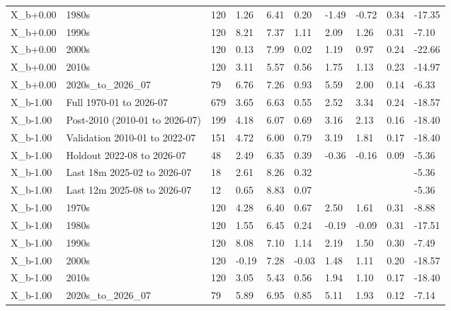 \begin{tabular}{llllllllll}
X\_b+0.00 & 1980s & 120 & 1.26 & 6.41 & 0.20 & -1.49 & -0.72 & 0.34 & -17.35 \\
X\_b+0.00 & 1990s & 120 & 8.21 & 7.37 & 1.11 & 2.09 & 1.26 & 0.31 & -7.10 \\
X\_b+0.00 & 2000s & 120 & 0.13 & 7.99 & 0.02 & 1.19 & 0.97 & 0.24 & -22.66 \\
X\_b+0.00 & 2010s & 120 & 3.11 & 5.57 & 0.56 & 1.75 & 1.13 & 0.23 & -14.97 \\
X\_b+0.00 & 2020s\_to\_2026\_07 & 79 & 6.76 & 7.26 & 0.93 & 5.59 & 2.00 & 0.14 & -6.33 \\
X\_b-1.00 & Full 1970-01 to 2026-07 & 679 & 3.65 & 6.63 & 0.55 & 2.52 & 3.34 & 0.24 & -18.57 \\
X\_b-1.00 & Post-2010 (2010-01 to 2026-07) & 199 & 4.18 & 6.07 & 0.69 & 3.16 & 2.13 & 0.16 & -18.40 \\
X\_b-1.00 & Validation 2010-01 to 2022-07 & 151 & 4.72 & 6.00 & 0.79 & 3.19 & 1.81 & 0.17 & -18.40 \\
X\_b-1.00 & Holdout 2022-08 to 2026-07 & 48 & 2.49 & 6.35 & 0.39 & -0.36 & -0.16 & 0.09 & -5.36 \\
X\_b-1.00 & Last 18m 2025-02 to 2026-07 & 18 & 2.61 & 8.26 & 0.32 &  &  &  & -5.36 \\
X\_b-1.00 & Last 12m 2025-08 to 2026-07 & 12 & 0.65 & 8.83 & 0.07 &  &  &  & -5.36 \\
X\_b-1.00 & 1970s & 120 & 4.28 & 6.40 & 0.67 & 2.50 & 1.61 & 0.31 & -8.88 \\
X\_b-1.00 & 1980s & 120 & 1.55 & 6.45 & 0.24 & -0.19 & -0.09 & 0.31 & -17.51 \\
X\_b-1.00 & 1990s & 120 & 8.08 & 7.10 & 1.14 & 2.19 & 1.50 & 0.30 & -7.49 \\
X\_b-1.00 & 2000s & 120 & -0.19 & 7.28 & -0.03 & 1.48 & 1.11 & 0.20 & -18.57 \\
X\_b-1.00 & 2010s & 120 & 3.05 & 5.43 & 0.56 & 1.94 & 1.10 & 0.17 & -18.40 \\
X\_b-1.00 & 2020s\_to\_2026\_07 & 79 & 5.89 & 6.95 & 0.85 & 5.11 & 1.93 & 0.12 & -7.14 \\
\bottomrule
\end{tabular}
